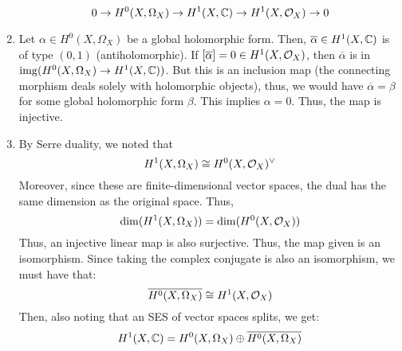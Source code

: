 \documentclass[12pt]{article}
\begin{document}
\begin{solution}
\begin{enumerate}
        \[0 \to H^0(X, \Omega_X) \to H^1(X, \mathbb C) \to H^1(X,\mathcal{O}_X) \to 0  \]   
        \item Let $\alpha \in H^0(X, \Omega_X)$ be a global holomorphic form. Then, $\overline{\alpha} \in H^1(X, \mathbb C)$ is of type $(0, 1)$ (antiholomorphic). If $[\overline{\alpha}] = 0 \in H^1(X, \mathcal{O}_X)$, then $\overline{\alpha}$ is in $\operatorname{img}(H^0(X, \Omega_X) \to H^1(X, \mathbb C))$. But this is an inclusion map (the connecting morphism deals solely with holomorphic objects), thus, we would have $\overline{\alpha} = \beta$ for some global holomorphic form $\beta$. This implies $\alpha = 0$. Thus, the map is injective. 
        \item By Serre duality, we noted that
        \[ H^1(X, \Omega_X) \cong H^0(X, \mathcal{O}_X)^\vee\]
        Moreover, since these are finite-dimensional vector spaces, the dual has the same dimension as the original space. Thus, 
        \[ \dim(H^1(X, \Omega_X)) = \dim(H^0(X, \mathcal{O}_X))\]
        Thus, an injective linear map is also surjective. Thus, the map given is an isomorphism. Since taking the complex conjugate is also an isomorphism, we must have that: 
        \[ \overline{H^0(X, \Omega_X)} \cong H^1(X, \mathcal{O}_X)\]
        Then, also noting that an SES of vector spaces splits, we get: 
        \[ H^1(X, \mathbb C) = H^0(X, \Omega_X) \oplus \overline{H^0(X, \Omega_X)}\]
    \end{enumerate}
\end{solution}
\newpage
\end{document}
